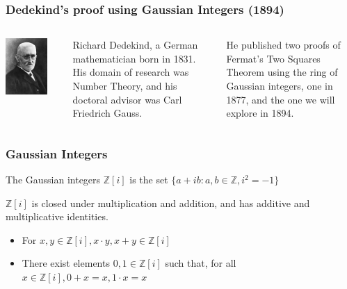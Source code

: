 \documentclass{beamer}
\begin{document}
\begin{frame}
	\frametitle{Dedekind's proof using Gaussian Integers (1894)}
	\begin{columns}
		\begin{center}
			\includegraphics[width=0.8\textwidth]{Richard_Dedekind_1900s.jpg}
		\end{center}
		Richard Dedekind, a German mathematician born in 1831.
		His domain of research was Number Theory, and his doctoral advisor was
		Carl Friedrich Gauss.
		
		He published two proofs of Fermat's Two Squares Theorem using the ring of
		Gaussian integers, one in 1877, and the one we will explore in 1894.

	\end{columns}
\end{frame}

\begin{frame}
	\frametitle{Gaussian Integers}
	The Gaussian integers $\mathbb{Z}[i]$ is the set 
	$\{a+ib:a, b \in \mathbb{Z}, i^2 = -1 \}$

	$\mathbb{Z}[i]$ is closed under multiplication and addition, and has additive and
	multiplicative identities.
	\begin{itemize}
		\item For $x,y \in \mathbb{Z}[i], x \cdot y, x + y \in \mathbb{Z}[i]$
		\item There exist elements $0, 1 \in \mathbb{Z}[i]$ such that, for all
			$x \in \mathbb{Z}[i], 0+x = x, 1 \cdot x = x$
	\end{itemize}
\end{frame}
\end{document}
